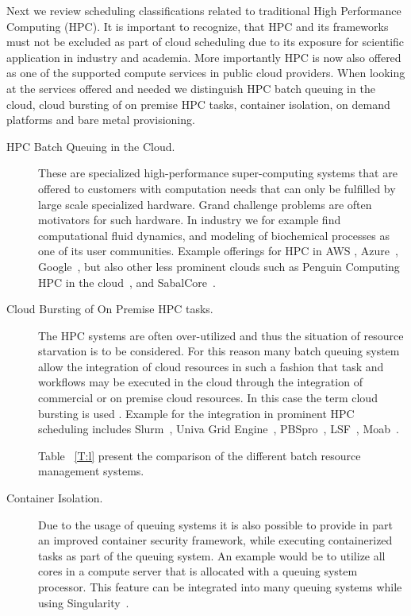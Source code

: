 \documentclass[final,5p,times,twocolumn]{elsarticle}
\begin{document}
Next we review scheduling classifications related to traditional High
Performance Computing (HPC). It is important to recognize, that HPC
and its frameworks must not be excluded as part of cloud scheduling
due to its exposure for scientific application in industry and
academia. More importantly HPC is now also offered as one of the supported
compute services in public cloud providers. When looking at the services offered
and needed we distinguish HPC batch queuing in the cloud, cloud
bursting of on premise HPC tasks, container isolation, on demand
platforms and bare metal provisioning.

\begin{description}

\item[HPC Batch Queuing in the Cloud.] These are specialized
  high-performance super-computing systems that are offered to
  customers with computation needs that can only be fulfilled by large
  scale specialized hardware. Grand challenge problems are often
  motivators for such hardware. In industry we for example find
  computational fluid dynamics, and modeling of biochemical processes
  as one of its user communities. Example offerings for HPC in AWS
  \cite{www-aws-hpc}, Azure~\cite{www-azure-hpc}, Google~\cite{www-google-hpc},
  but also other less prominent clouds such as Penguin Computing HPC
  in the cloud~\cite{PODHPCCloud2019}, and
  SabalCore~\cite{Sabalcore2019}.
  
\item[Cloud Bursting of On Premise HPC tasks.] The HPC systems are
  often over-utilized and thus the situation of resource starvation is
  to be considered. For this reason many batch queuing system allow
  the integration of cloud resources in such a fashion that task and
  workflows may be executed in the cloud through the integration of
  commercial or on premise cloud resources. In this case the term
  cloud bursting is used
  \cite{CloudBursting2019,BurstingHPC2019}. Example for the
  integration in prominent HPC scheduling includes
  Slurm~\cite{www-slurm}, Univa Grid Engine~\cite{www-univa},
  PBSpro~\cite{www-pbs-manual}, LSF~\cite{www-lsf},
  Moab~\cite{www-moab}.

  \color{red}
  Table ~\ref{T:l} present the comparison of the different batch resource management systems.
  
  \color{black}

\item[Container Isolation.] Due to the usage of queuing systems it is
  also possible to provide in part an improved container security
  framework, while executing containerized tasks as part of the
  queuing system. An example would be to utilize all cores in a
  compute server that is allocated with a queuing system
  processor. This feature can be integrated into many queuing systems
  while using Singularity~\cite{www-singularity}.


\end{description}
\end{document}

